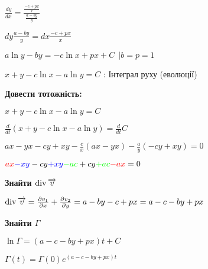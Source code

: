 $\frac{dy}{dx} = \frac{\frac{-c + px}{x}}{\frac{a-by}{y}}$

$dy\frac{a-by}{y} = dx\frac{-c + px}{x}$

$a\ln y - by = -c\ln x + px + C\ \ | b=p =1$ 

$x + y -c\ln x -a\ln y = C$ : Інтеграл руху (еволюції)


\textbf{Довести тотожність:}

$x + y -c\ln x -a\ln y = C$

$\frac{d}{dt}(x + y -c\ln x -a\ln y) = \frac{d}{dt}C$ 

$ax - yx - cy + xy -\frac{c}{x}(ax-yx)  - \frac{a}{y}(-cy +xy) = 0$

$\textcolor{red}{ax} \textcolor{blue}{- xy} - cy \textcolor{blue}{+ xy} \textcolor{green}{-ac} + cy \textcolor{green}{+ ac} \textcolor{red}{- ax} = 0$


\textbf{Знайти $\operatorname*{div} \overrightarrow{v}$}

$\operatorname*{div} \overrightarrow{v} = \frac{\partial v_1 }{\partial x} + \frac{\partial v_2}{\partial y } = 
a - by - c +px = a - c -by + px$



\textbf{Знайти $\Gamma $}

$\ln \Gamma = (a - c - by + px) t + C$

$\Gamma(t) = \Gamma(0)e^{(a- c - by +px)t}$